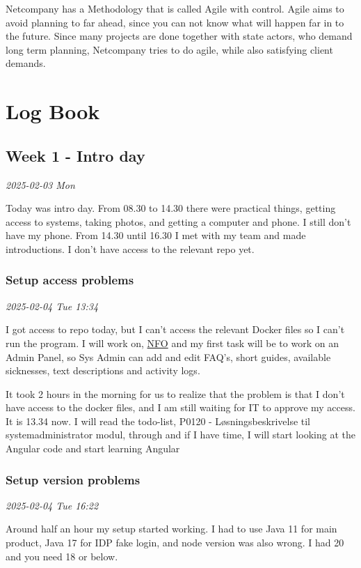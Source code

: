 \documentclass[../main.tex]{subfiles}
\begin{document}
Netcompany has a Methodology that is called Agile with control. Agile aims to avoid planning to far ahead, since you can not know what will happen far in to the future.
Since many projects are done together with state actors, who demand long term planning, Netcompany tries to do agile, while also satisfying client demands. 
\section{Log Book}
\subsection{Week 1 - Intro day}

\noindent \textit{2025-02-03 Mon}

Today was intro day. From 08.30 to 14.30 there were practical things, getting access to systems, taking photos, and getting a computer and phone. I still don't have my phone. From 14.30 until 16.30 I met with my team and made introductions. I don't have access to the relevant repo yet.

\subsubsection{Setup access problems}

\noindent \textit{2025-02-04 Tue 13:34}

I got access to repo today, but I can't access the relevant Docker files so I can't run the program. I will work on, \href{https://nationaltforsoegsoverblik.dk/}{NFO} and my first task will be to work on an Admin Panel, so Sys Admin can add and edit FAQ's, short guides, available sicknesses, text descriptions and activity logs.

It took 2 hours in the morning for us to realize that the problem is that I don't have access to the docker files, and I am still waiting for IT to approve my access. It is 13.34 now. I will read the todo-list, P0120 - Løsningsbeskrivelse til systemadministrator modul, through and if I have time, I will start looking at the Angular code and start learning Angular

\subsubsection{Setup version problems}

\noindent \textit{2025-02-04 Tue 16:22}

Around half an hour my setup started working. I had to use Java 11 for main product, Java 17 for IDP fake login, and node version was also wrong. I had 20 and you need 18 or below.
\end{document}
